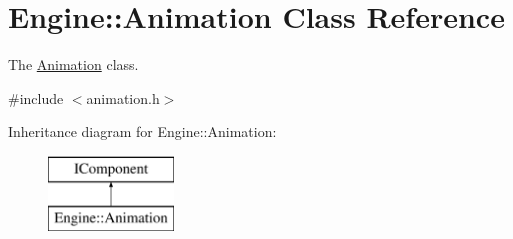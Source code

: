 \hypertarget{classEngine_1_1Animation}{}\section{Engine\+:\+:Animation Class Reference}
\label{classEngine_1_1Animation}


The \hyperlink{classEngine_1_1Animation}{Animation} class.  




{\ttfamily \#include $<$animation.\+h$>$}

Inheritance diagram for Engine\+:\+:Animation\+:\begin{figure}[H]
\begin{center}
\leavevmode
\includegraphics[height=2.000000cm]{classEngine_1_1Animation}
\end{center}
\end{figure}
